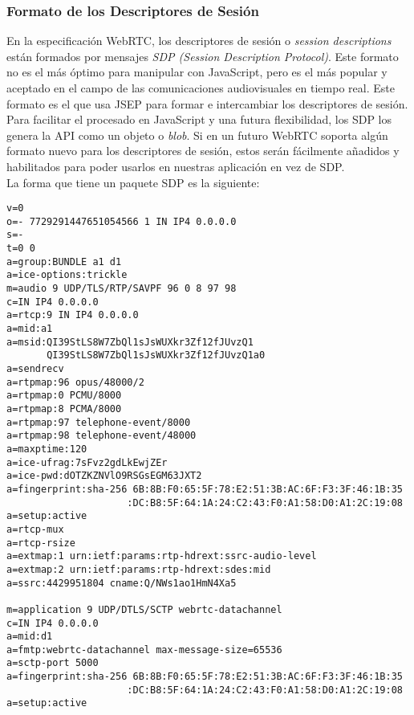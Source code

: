 \subsubsection{Formato de los Descriptores de Sesión}

En la especificación WebRTC, los descriptores de sesión o \emph{session descriptions} están formados por mensajes \textit{SDP (Session Description Protocol)}. Este formato no es el más óptimo para manipular con JavaScript, pero es el más popular y aceptado en el campo de las comunicaciones audiovisuales en tiempo real. Este formato es el que usa JSEP para formar e intercambiar los descriptores de sesión.\\

Para facilitar el procesado en JavaScript y una futura flexibilidad, los SDP los genera la API como un objeto o \textit{blob}. Si en un futuro WebRTC soporta algún formato nuevo para los descriptores de sesión, estos serán fácilmente añadidos y habilitados para poder usarlos en nuestras aplicación en vez de SDP.\\

La forma que tiene un paquete SDP es la siguiente:

\begin{lstlisting}[caption=Ejemplo paquete SDP]
v=0
o=- 7729291447651054566 1 IN IP4 0.0.0.0
s=-
t=0 0
a=group:BUNDLE a1 d1
a=ice-options:trickle
m=audio 9 UDP/TLS/RTP/SAVPF 96 0 8 97 98
c=IN IP4 0.0.0.0
a=rtcp:9 IN IP4 0.0.0.0
a=mid:a1
a=msid:QI39StLS8W7ZbQl1sJsWUXkr3Zf12fJUvzQ1
       QI39StLS8W7ZbQl1sJsWUXkr3Zf12fJUvzQ1a0
a=sendrecv
a=rtpmap:96 opus/48000/2
a=rtpmap:0 PCMU/8000
a=rtpmap:8 PCMA/8000
a=rtpmap:97 telephone-event/8000
a=rtpmap:98 telephone-event/48000
a=maxptime:120
a=ice-ufrag:7sFvz2gdLkEwjZEr
a=ice-pwd:dOTZKZNVlO9RSGsEGM63JXT2
a=fingerprint:sha-256 6B:8B:F0:65:5F:78:E2:51:3B:AC:6F:F3:3F:46:1B:35
                     :DC:B8:5F:64:1A:24:C2:43:F0:A1:58:D0:A1:2C:19:08
a=setup:active
a=rtcp-mux
a=rtcp-rsize
a=extmap:1 urn:ietf:params:rtp-hdrext:ssrc-audio-level
a=extmap:2 urn:ietf:params:rtp-hdrext:sdes:mid
a=ssrc:4429951804 cname:Q/NWs1ao1HmN4Xa5

m=application 9 UDP/DTLS/SCTP webrtc-datachannel
c=IN IP4 0.0.0.0
a=mid:d1
a=fmtp:webrtc-datachannel max-message-size=65536
a=sctp-port 5000
a=fingerprint:sha-256 6B:8B:F0:65:5F:78:E2:51:3B:AC:6F:F3:3F:46:1B:35
                     :DC:B8:5F:64:1A:24:C2:43:F0:A1:58:D0:A1:2C:19:08
a=setup:active
\end{lstlisting}



